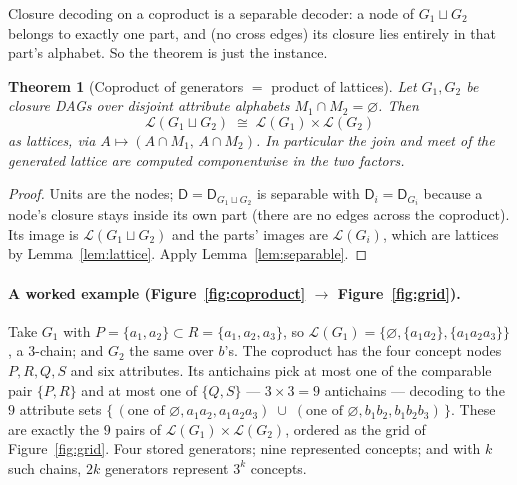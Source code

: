 \documentclass[11pt]{article}
\theoremstyle{definition}
\theoremstyle{plain}
\newtheorem{theorem}{Theorem}
\theoremstyle{remark}
\newcommand{\Dcode}{\mathsf{D}}            %
\newcommand{\Lgen}{\mathcal{L}}            %
\newcommand{\Gcoprod}{\sqcup}             %
\newcommand{\attrs}{M}
\begin{document}
Closure decoding on a coproduct is a separable decoder: a node of
$G_1\Gcoprod G_2$ belongs to exactly one part, and (no cross edges) its closure
lies entirely in that part's alphabet. So the theorem is just the instance.

\begin{theorem}[Coproduct of generators $=$ product of lattices]
\label{thm:main}
Let $G_1,G_2$ be closure DAGs over disjoint attribute alphabets
$\attrs_1\cap\attrs_2=\varnothing$. Then
\[
  \Lgen\!\left(G_1\Gcoprod G_2\right)\;\cong\;\Lgen(G_1)\times\Lgen(G_2)
\]
as lattices, via $A\mapsto(A\cap\attrs_1,\,A\cap\attrs_2)$. In particular the
join and meet of the generated lattice are computed \emph{componentwise} in the
two factors.
\end{theorem}

\begin{proof}
Units are the nodes; $\Dcode=\Dcode_{G_1\sqcup G_2}$ is separable with
$\Dcode_i=\Dcode_{G_i}$ because a node's closure stays inside its own part
(there are no edges across the coproduct). Its image is $\Lgen(G_1\Gcoprod G_2)$
and the parts' images are $\Lgen(G_i)$, which are lattices by
Lemma~\ref{lem:lattice}. Apply Lemma~\ref{lem:separable}.
\end{proof}

\paragraph{A worked example (Figure~\ref{fig:coproduct} $\to$
Figure~\ref{fig:grid}).}
Take $G_1$ with $P=\{a_1,a_2\}\subset R=\{a_1,a_2,a_3\}$, so
$\Lgen(G_1)=\{\varnothing,\{a_1a_2\},\{a_1a_2a_3\}\}$, a $3$-chain; and $G_2$ the
same over $b$'s. The coproduct has the four concept nodes $P,R,Q,S$ and six
attributes. Its antichains pick at most one of the comparable pair $\{P,R\}$ and
at most one of $\{Q,S\}$ --- $3\times 3=9$ antichains --- decoding to the $9$
attribute sets
$\{\,(\text{one of }\varnothing,a_1a_2,a_1a_2a_3)\;\cup\;(\text{one of }\varnothing,b_1b_2,b_1b_2b_3)\,\}$.
These are exactly the $9$ pairs of $\Lgen(G_1)\times\Lgen(G_2)$, ordered as the
grid of Figure~\ref{fig:grid}. Four stored generators; nine represented concepts;
and with $k$ such chains, $2k$ generators represent $3^{k}$ concepts.
\end{document}
